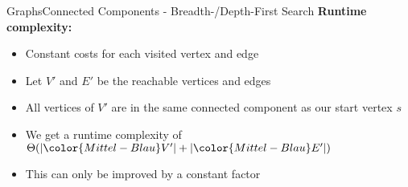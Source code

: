\begin{frame}{Graphs}{Connected Components - Breadth-/Depth-First Search}
  \textbf{Runtime complexity:}
  \begin{itemize}
    \item<2->
      Constant costs for each visited vertex and edge
    \item<3->
      Let {\color{Mittel-Blau}$V'$} and {\color{Mittel-Blau}$E'$} be the
      reachable vertices and edges
    \item<4->
      All vertices of {\color{Mittel-Blau}$V'$} are in the same connected
      component as our start vertex {\color{Mittel-Blau}$s$}
    \item<5->
      We get a runtime complexity of
      \begin{math}
        \Theta(\vert {\color{Mittel-Blau}V'} \vert
          + \vert {\color{Mittel-Blau}E'} \vert)
      \end{math}
    \item<6->
      This can only be improved by a constant factor
  \end{itemize}
\end{frame}
